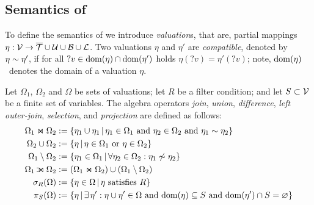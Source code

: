 \subsection{{\RDFplus} Semantics of {\SPARQLplus}}
	To define the semantics of {\SPARQLplus} we introduce
\emph{valuation}s, that are, partial mappings $\eta : \mathcal{V} \rightarrow \overline{\mathcal{T}} \cup \mathcal{U} \cup \mathcal{B} \cup \mathcal{L}$.
Two valuations $\eta$ and $\eta'$ are \emph{compatible}, denoted by $\eta \sim \eta'$, if for all $?v \in \mathrm{dom}(\eta) \cap \mathrm{dom}(\eta')$ holds $\eta(?v) = \eta'(?v)$; note,
	$\mathrm{dom}(\eta)$~denotes %
the domain of a valuation $\eta$.

Let $\Omega_1$, $\Omega_2$ and $\Omega$ be sets of valuations; let $R$ be a filter condition; and let $S \subset \mathcal{V}$ be a finite set of variables. The algebra operators \emph{join}, \emph{union}, \emph{difference}, \emph{left outer-join}, \emph{selection}, and \emph{projection} are defined as follows:
\begin{align*}
	\Omega_1 \Join \Omega_2 & := \lbrace \eta_1 \cup \eta_1 \,|\, \eta_1 \in \Omega_1 \text{ and } \eta_2 \in \Omega_2 \text{ and } \eta_1 \sim \eta_2 \rbrace \\
	\Omega_2 \cup \Omega_2 & := \lbrace \eta \,|\, \eta \in \Omega_1 \text{ or } \eta \in \Omega_2 \rbrace \\
	\Omega_1 \setminus \Omega_2 & := \lbrace \eta_1 \in \Omega_1 \,|\, \forall \eta_2 \in \Omega_2 : \eta_1 \not\sim \eta_2 \rbrace \\
	\Omega_1 \LJoin \Omega_2 &:= \left( \Omega_1 \Join \Omega_2 \right) \cup \left( \Omega_1 \setminus \Omega_2 \right) \\
	\sigma_R ( \Omega ) &:= \lbrace \eta \in \Omega \,|\, \eta \text{ satisfies } R \rbrace \\
	\pi_S ( \Omega ) &:= \lbrace \eta \,|\, \exists \, \eta' : \eta \cup \eta' \in \Omega \text{ and } \fctDom{\eta} \subseteq S \text{ and } \fctDom{\eta'} \cap S = \emptyset \rbrace
\end{align*}


